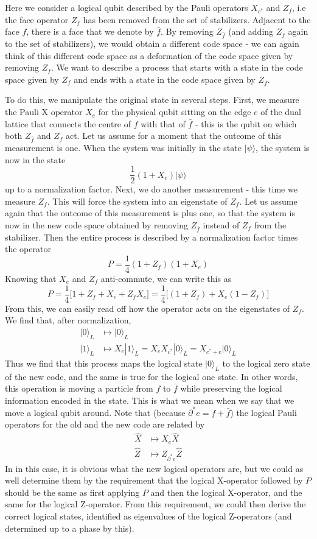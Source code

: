 \documentclass[a4paper, draft]{article}
\theoremstyle{own}
\theoremstyle{remark}
\begin{document}
Here we consider a logical qubit described by the Pauli operators $X_{c^*}$ and $Z_f$, i.e the face operator $Z_f$ has been removed from the set of stabilizers. Adjacent to the face $f$, there is a face that we denote by $\bar{f}$. By removing $Z_{\bar{f}}$ (and adding $Z_f$ again to the set of stabilizers), we would obtain a different code space - we can again think of this different code space as a deformation of the code space given by removing $Z_f$. We want to describe a process that starts with a state in the code space given by $Z_f$ and ends with a state in the code space given by $Z_{\bar{f}}$. 

To do this, we manipulate the original state in several steps. First, we measure the Pauli X operator $X_e$ for the physical qubit sitting on the edge $e$ of the dual lattice that connects the centre of $f$ with that of $\bar{f}$ - this is the qubit on which both $Z_{\bar{f}}$ and $Z_f$ act. Let us assume for a moment that the outcome of this measurement is one. When the system was initially in the state $|\psi\rangle$, the system is now in the state
$$
\frac{1}{2} (1 + X_e) |\psi \rangle
$$
up to a normalization factor. Next, we do another measurement - this time we measure $Z_f$. This will force the system into an eigenstate of $Z_f$. Let us assume again that the outcome of this measurement is plus one, so that the system is now in the new code space obtained by removing $Z_{\bar{f}}$ instead of $Z_f$ from the stabilizer. Then the entire process is described by a normalization factor times the operator
$$
P = \frac{1}{4}(1 + Z_f)(1 + X_e)
$$
Knowing that $X_e$ and $Z_f$ anti-commute, we can write this as
$$
P = \frac{1}{4} \big[ 1 + Z_f + X_e + Z_f X_e \big]
= \frac{1}{4} \big[ (1 + Z_f) + X_e (1 - Z_f) \big]
$$
From this, we can easily read off how the operator acts on the eigenstates of $Z_f$. We find that, after normalization,
\begin{align*}
|0 \rangle_L &\mapsto |0 \rangle_L \\
|1 \rangle_L &\mapsto X_e |1 \rangle_L = X_e X_{c^*} |0 \rangle_L = X_{c^* + e} |0 \rangle_L
\end{align*}
Thus we find that this process maps the logical state $|0 \rangle_L$ to the logical zero state of the new code, and the same is true for the logical one state. In other words, this operation is moving a particle from $f$ to $\bar{f}$ while preserving the logical information encoded in the state. This is what we mean when we say that we move a logical qubit around. Note that (because $\partial^* e = f + \bar{f}$) the logical Pauli operators for the old and the new code are related by
\begin{align*}
\hat{X} &\mapsto  X_e \hat{X} \\
\hat{Z} &\mapsto Z_{\partial^* e} \hat{Z}
\end{align*}
In in this case, it is obvious what the new logical operators are, but we could as well determine them by the requirement that the logical X-operator followed by $P$ should be the same as first applying $P$ and then the logical X-operator, and the same for the logical Z-operator. From this requirement, we could then derive the correct logical states, identified as eigenvalues of the logical Z-operators (and determined up to a phase by this).
\end{document}
